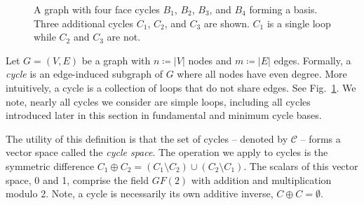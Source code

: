 \documentclass[fleqn,11pt]{article}
\newcommand\CycSp{\mathcal{C}}    %
\begin{document}
\begin{figure}[t]
	\caption{A graph with four face cycles $B_1$, $B_2$, $B_3$, and $B_4$ forming a basis. Three additional cycles $C_1$, $C_2$, and $C_3$ are shown. $C_1$ is a single loop while $C_2$ and $C_3$ are not.}
	\label{fig:cyc_space} 
\end{figure}

Let $G=(V,E)$ be a graph with $n\coloneq|V|$ nodes and $m\coloneq|E|$ edges. Formally, a \textit{cycle} is an edge-induced subgraph of $G$ where all nodes have even degree. More intuitively, a cycle is a collection of loops that do not share edges. See Fig.~\ref{fig:cyc_space}. We note, nearly all cycles we consider are simple loops, including all cycles introduced later in this section in fundamental and minimum cycle bases.

The utility of this definition is that the set of cycles -- denoted by $\CycSp$ -- forms a vector space called the \textit{cycle space}. %
The operation we apply to cycles is the symmetric difference $C_1\oplus C_2=(C_1\setminus C_2)\cup(C_2\setminus C_1)$. %
The scalars of this vector space, 
0 and 1, comprise the field $GF(2)$ with addition and multiplication modulo 2.
Note, a cycle is necessarily its own additive inverse, $C\oplus C = \emptyset$.  
\end{document}
